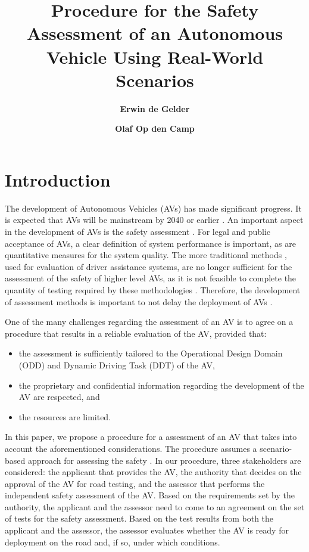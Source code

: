 \documentclass[twoside,twocolumn,9pt]{article}
\title{Procedure for the Safety Assessment of an Autonomous Vehicle Using Real-World Scenarios} %
\author[1,2]{\large\bfseries Erwin de Gelder}
\author[1]{\large\bfseries Olaf Op den Camp}
\affil[1]{\normalsize\textit{TNO, Integrated Vehicle Safety, Helmond, The Netherlands (E-mail: erwin.degelder@tno.nl, olaf.opdencamp@tno.nl)}}
\affil[2]{\normalsize\textit{Delft University of Technology, Delft Center for Systems and Control, Delft, The Netherlands}}
\date{} %
\theoremstyle{plain}
\theoremstyle{remark}\newtheorem{remarkenv}{Remark}        %
\begin{document}
	
\maketitle

\section{Introduction}
\label{sec:introduction}

The development of Autonomous Vehicles (AVs) has made significant progress. It is expected that AVs will be mainstream by 2040 \cite{madni2018autonomous} or earlier \cite{bimbraw2015autonomous}. 
An important aspect in the development of AVs is the safety assessment \cite{bengler2014threedecades, stellet2015taxonomy, Helmer2017safety, putz2017pegasus, wachenfeld2016release}. For legal and public acceptance of AVs, a clear definition of system performance is important, as are quantitative measures for the system quality. The more traditional methods \cite{ISO26262, response2006code}, used for evaluation of driver assistance systems, are no longer sufficient for the assessment of the safety of higher level AVs, as it is not feasible to complete the quantity of testing required by these methodologies \cite{wachenfeld2016release}. Therefore, the development of assessment methods is important to not delay the deployment of AVs \cite{bengler2014threedecades}.

One of the many challenges regarding the assessment of an AV \cite{koopman2016challenges} is to agree on a procedure that results in a reliable evaluation of the AV, provided that:
\begin{itemize}
	\item the assessment is sufficiently tailored to the Operational Design Domain (ODD) and Dynamic Driving Task (DDT) of the AV,
	\item the proprietary and confidential information regarding the development of the AV are respected, and
	\item the resources are limited. 
\end{itemize}
In this paper, we propose a procedure for a assessment of an AV that takes into account the aforementioned considerations. The procedure assumes a scenario-based approach for assessing the safety \cite{putz2017pegasus, winner2017pegasus, nhtsa2018framework}. In our procedure, three stakeholders are considered: the applicant that provides the AV, the authority that decides on the approval of the AV for road testing, and the assessor that performs the independent safety assessment of the AV. Based on the requirements set by the authority, the applicant and the assessor need to come to an agreement on the set of tests for the safety assessment. Based on the test results from both the applicant and the assessor, the assessor evaluates whether the AV is ready for deployment on the road and, if so, under which conditions.
\end{document}
